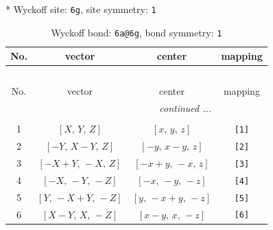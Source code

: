 \documentclass[fleqn,8pt]{jsarticle}
\begin{document}
* Wyckoff site: {\tt 6g}, site symmetry: {\tt 1}
\renewcommand{\arraystretch}{1.2}
\begin{longtable}{cccc}
\caption{Wyckoff bond: {\tt 6a@6g}, bond symmetry: {\tt 1}}
 \\
 \hline \hline
No. & vector & center & mapping \\ \hline \endfirsthead

\multicolumn{3}{l}{\tablename\ \thetable{}} \\
 \hline \hline
No. & vector & center & mapping \\ \hline \endhead

 \hline \hline
\multicolumn{3}{r}{\footnotesize\it continued ...} \\ \endfoot

 \hline \hline
\multicolumn{3}{r}{} \\ \endlastfoot

1 & $\left[ X,\, Y,\, Z \right]$ & $\left[ x,\, y,\, z \right]$ & {\tt [1]} \\ \hline
2 & $\left[ - Y,\, X - Y,\, Z \right]$ & $\left[ - y,\, x - y,\, z \right]$ & {\tt [2]} \\ \hline
3 & $\left[ - X + Y,\, - X,\, Z \right]$ & $\left[ - x + y,\, - x,\, z \right]$ & {\tt [3]} \\ \hline
4 & $\left[ - X,\, - Y,\, - Z \right]$ & $\left[ - x,\, - y,\, - z \right]$ & {\tt [4]} \\ \hline
5 & $\left[ Y,\, - X + Y,\, - Z \right]$ & $\left[ y,\, - x + y,\, - z \right]$ & {\tt [5]} \\ \hline
6 & $\left[ X - Y,\, X,\, - Z \right]$ & $\left[ x - y,\, x,\, - z \right]$ & {\tt [6]} \\
\end{longtable}
\end{document}
